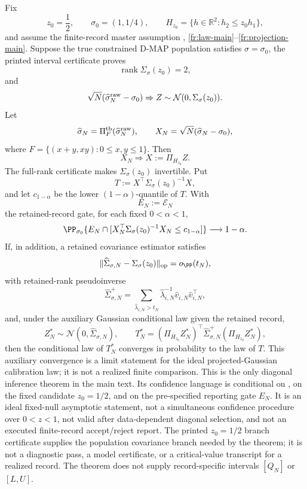 \begin{proposition}\label{prop:e-fixed-candidate-exchange-diagonal-detailed}
Fix
\[
z_0=\frac12,\qquad \sigma_0=(1,1/4),\qquad
H_{z_0}=\{h\in\mathbb R^2:h_2\le z_0h_1\},
\]
and assume the finite-record master assumption
,
\ref{fr:law-main}--\ref{fr:projection-main}.  Suppose the true constrained D-MAP
population satisfies \(\sigma=\sigma_0\), the printed interval certificate
 proves
\[
\operatorname{rank}\Sigma_\sigma(z_0)=2,
\]
and
\[
\sqrt N(\widehat\sigma_N^{\rm raw}-\sigma_0)
\Rightarrow Z\sim\mathcal N(0,\Sigma_\sigma(z_0)).
\]
Let
\[
\widehat\sigma_N=\Pi_F^{\rm tb}(\widehat\sigma_N^{\rm raw}),\qquad
X_N=\sqrt N(\widehat\sigma_N-\sigma_0),
\]
where \(F=\{(x+y,xy):0\le x,y\le1\}\).  Then
\[
X_N\Rightarrow X:=\Pi_{H_{z_0}}Z .
\]
The full-rank certificate makes \(\Sigma_\sigma(z_0)\) invertible.  Put
\[
T:=X^\top\Sigma_\sigma(z_0)^{-1}X,
\]
and let \(c_{1-\alpha}\) be the lower \((1-\alpha)\)-quantile of \(T\).  With
\[
E_N:=\mathcal E_N
\]
the retained-record gate, for each fixed \(0<\alpha<1\),
\[
\PP_{\sigma_0}\{E_N\cap[
X_N^\top\Sigma_\sigma(z_0)^{-1}X_N\le c_{1-\alpha}]\}
\longrightarrow 1-\alpha .
\]
If, in addition, a retained covariance estimator satisfies
\[
\|\widehat\Sigma_{\sigma,N}-\Sigma_\sigma(z_0)\|_{\operatorname{op}}
=o_{\PP}(t_N),
\]
with retained-rank pseudoinverse
\[
\widehat\Sigma_{\sigma,N}^{+}
=\sum_{\widehat\lambda_{i,N}>t_N}
\widehat\lambda_{i,N}^{-1}
\widehat v_{i,N}\widehat v_{i,N}^{\top},
\]
and, under the auxiliary Gaussian conditional law given the retained record,
\[
Z_N^\ast\sim\mathcal N(0,\widehat\Sigma_{\sigma,N}),\qquad
T_N^\ast=
(\Pi_{H_{z_0}}Z_N^\ast)^\top
\widehat\Sigma_{\sigma,N}^{+}(\Pi_{H_{z_0}}Z_N^\ast),
\]
then the conditional law of \(T_N^\ast\) converges in probability to the law
of \(T\).  This auxiliary convergence is a limit statement for the ideal
projected-Gaussian calibration law; it is not a realized finite comparison.
This is the only diagonal inference theorem in the main text.  Its confidence
language is conditional on , on the
fixed candidate \(z_0=1/2\), and on the pre-specified reporting gate \(E_N\).
It is an ideal fixed-null asymptotic statement, not a simultaneous confidence
procedure over \(0<z<1\), not valid after data-dependent diagonal selection,
and not an executed finite-record accept/reject report.  The printed
\(z_0=1/2\) branch certificate supplies the population covariance branch
needed by the theorem; it is not a diagnostic pass, a model certificate, or a
critical-value transcript for a realized record.  The theorem does not supply
record-specific intervals \([Q_N]\) or \([L,U]\).
\end{proposition}

